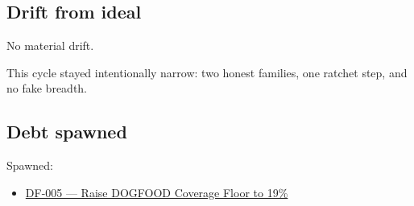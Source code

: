 \subsection{Drift from ideal}\label{record-066-drift-from-ideal}

No material drift.

This cycle stayed intentionally narrow: two honest families, one ratchet step, and no fake breadth.

\subsection{Debt spawned}\label{record-066-debt-spawned}

Spawned:

\begin{itemize}
\tightlist
\item
  \href{https://github.com/flyingrobots/bijou/blob/cbd70612140e7a450d764b3c7be1c6af878b99bc/docs/design/DF-005-raise-dogfood-coverage-floor-to-19-percent.md}{DF-005 --- Raise DOGFOOD Coverage Floor to 19\%}
\end{itemize}

